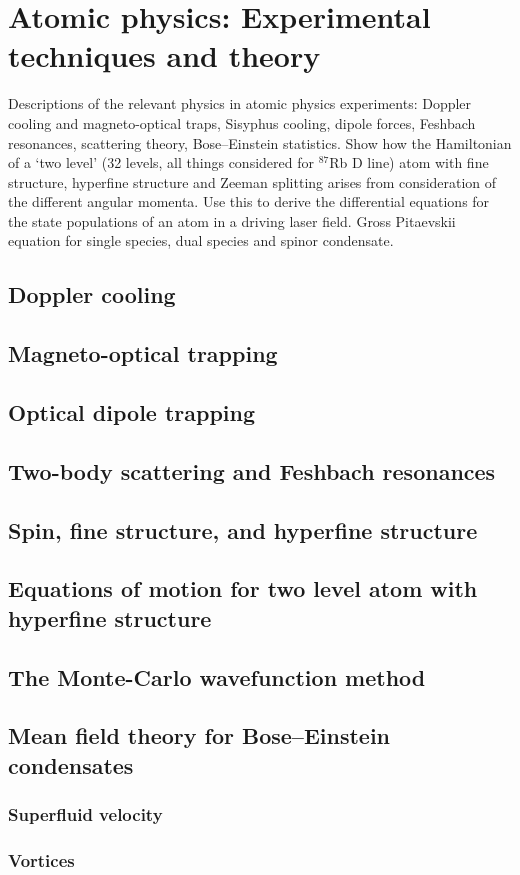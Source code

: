 \chapter{Atomic physics: Experimental techniques and theory}

Descriptions of the relevant physics in atomic physics experiments: Doppler cooling and magneto-optical traps, Sisyphus cooling, dipole forces, Feshbach resonances, scattering theory, Bose–Einstein statistics. Show how the Hamiltonian of a `two level' (32 levels, all things considered for $^{87}$Rb D line) atom with fine structure, hyperfine structure and Zeeman splitting arises from consideration of the different angular momenta. Use this to derive the differential equations for the state populations of an atom in a driving laser field. Gross Pitaevskii equation for single species, dual species and spinor condensate.

\section{Doppler cooling}
\section{Magneto-optical trapping}
\section{Optical dipole trapping}
\section{Two-body scattering and Feshbach resonances}
\section{Spin, fine structure, and hyperfine structure}
\section{Equations of motion for two level atom with hyperfine structure}
\section{The Monte-Carlo wavefunction method}
\section{Mean field theory for Bose–Einstein condensates}
    \subsection{Superfluid velocity}
    \subsection{Vortices}
